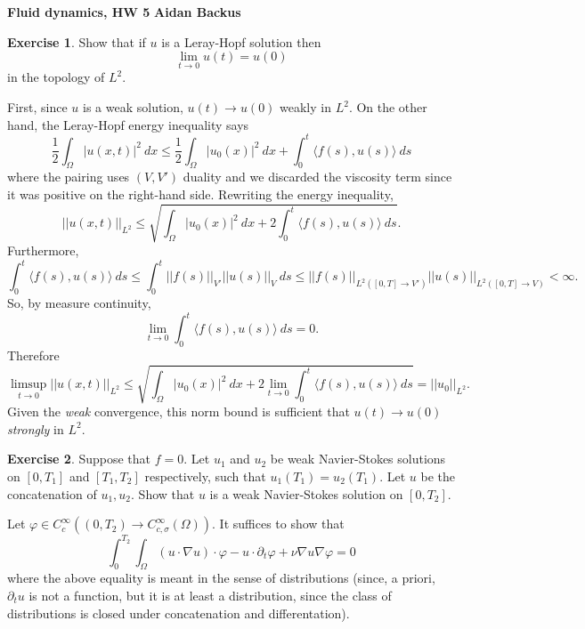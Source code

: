 \documentclass[10pt]{article}
\theoremstyle{definition}
\newtheorem{exer}{Exercise}
\begin{document}
\noindent
\large\textbf{Fluid dynamics, HW 5} \hfill \textbf{Aidan Backus} \\

\begin{exer}
Show that if $u$ is a Leray-Hopf solution then
$$\lim_{t \to 0} u(t) = u(0)$$
in the topology of $L^2$.
\end{exer}

First, since $u$ is a weak solution, $u(t) \to u(0)$ weakly in $L^2$.
On the other hand, the Leray-Hopf energy inequality says
$$\frac{1}{2} \int_\Omega |u(x, t)|^2 ~dx \leq \frac{1}{2} \int_\Omega |u_0(x)|^2 ~dx + \int_0^t \langle f(s), u(s)\rangle ~ds$$
where the pairing uses $(V, V')$ duality and we discarded the viscosity term since it was positive on the right-hand side.
Rewriting the energy inequality,
$$||u(x, t)||_{L^2} \leq \sqrt{\int_\Omega |u_0(x)|^2 ~dx + 2\int_0^t \langle f(s), u(s)\rangle~ds}.$$
Furthermore,
$$\int_0^t \langle f(s), u(s)\rangle~ds \leq \int_0^t ||f(s)||_{V'} ||u(s)||_V ~ds \leq ||f(s)||_{L^2([0, T] \to V')} ||u(s)||_{L^2([0, T] \to V)} < \infty.$$
So, by measure continuity,
$$\lim_{t \to 0} \int_0^t \langle f(s), u(s)\rangle~ds = 0.$$
Therefore
$$\limsup_{t \to 0} ||u(x, t)||_{L^2} \leq \sqrt{\int_\Omega |u_0(x)|^2 ~dx + 2\lim_{t \to 0} \int_0^t \langle f(s), u(s)\rangle ~ds} = ||u_0||_{L^2}.$$
Given the \emph{weak} convergence, this norm bound is sufficient that $u(t) \to u(0)$ \emph{strongly} in $L^2$.

\begin{exer}
Suppose that $f = 0$.
Let $u_1$ and $u_2$ be weak Navier-Stokes solutions on $[0, T_1]$ and $[T_1, T_2]$ respectively, such that $u_1(T_1) = u_2(T_1)$. Let $u$ be the concatenation of $u_1,u_2$.
Show that $u$ is a weak Navier-Stokes solution on $[0, T_2]$.
\end{exer}

Let $\varphi \in C^\infty_c((0, T_2) \to C^\infty_{c, \sigma}(\Omega))$. It suffices to show that
\begin{equation}
\label{exer 2 goal}
\int_0^{T_2} \int_\Omega (u \cdot \nabla u) \cdot \varphi - u \cdot \partial_t \varphi + \nu \nabla u \nabla \varphi = 0
\end{equation}
where the above equality is meant in the sense of distributions (since, a priori, $\partial_t u$ is not a function, but it is at least a distribution, since the class of distributions is closed under concatenation and differentation).
\end{document}
